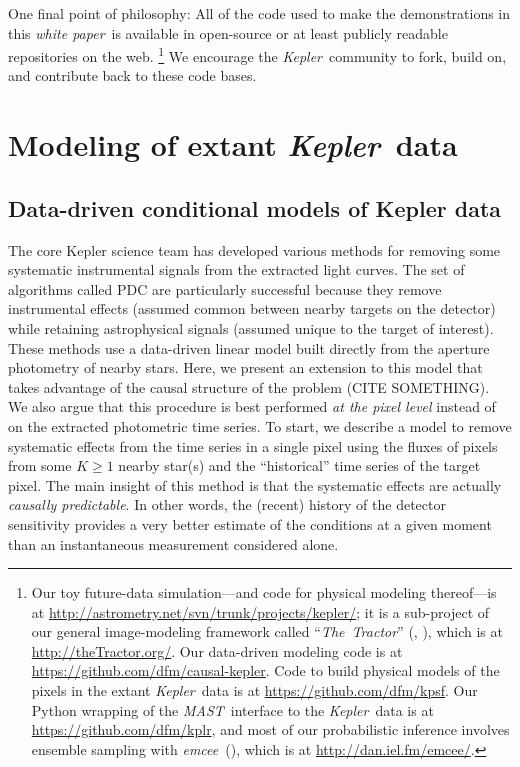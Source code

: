 \documentclass[letterpaper,12pt,preprint]{aastex}
\newcommand{\documentname}{\textsl{white paper}}
\newcommand{\observatory}[1]{\textsl{#1}}
\newcommand{\Kepler}{\observatory{Kepler}}
\newcommand{\project}[1]{\textsl{#1}}
\newcommand{\MAST}{\project{MAST}}
\newcommand{\TheTractor}{\project{The~Tractor}}
\newcommand{\emcee}{\project{emcee}}
\begin{document}
One final point of philosophy:
All of the code used to make the demonstrations in this \documentname\ is available
  in open-source or at least publicly readable repositories on the web.%
\footnote{Our toy future-data simulation---and code for physical modeling thereof---is at
  \url{http://astrometry.net/svn/trunk/projects/kepler/};
  it is a sub-project of our general image-modeling framework
  called ``\TheTractor'' (\citealt{hoggtractor}, \citealt{langtractor}), which is at
  \url{http://theTractor.org/}.
  Our data-driven modeling code is at
  \url{https://github.com/dfm/causal-kepler}.
  Code to build physical models of the pixels in the extant \Kepler\ data is at
  \url{https://github.com/dfm/kpsf}.
  Our Python wrapping of the \MAST\ interface to the \Kepler\ data is at
  \url{https://github.com/dfm/kplr},
  and most of our probabilistic inference involves ensemble sampling
  with \emcee\ (\citealt{emcee}), which is at
  \url{http://dan.iel.fm/emcee/}.}
We encourage the \Kepler\ community to fork, build on, and contribute back to these code bases.

\section{Modeling of extant \Kepler\ data}\label{sec:extant}

\subsection{Data-driven conditional models of Kepler data}

The core Kepler science team has developed various methods for removing some
systematic instrumental signals from the extracted light curves.
The set of algorithms called PDC \citep{map-pdc1,map-pdc2} are particularly
successful because they remove instrumental effects (assumed common between
nearby targets on the detector) while retaining astrophysical signals (assumed
unique to the target of interest).
These methods use a data-driven linear model built directly from the aperture
photometry of nearby stars.
Here, we present an extension to this model that takes advantage of the causal
structure of the problem (CITE SOMETHING).
We also argue that this procedure is best performed \emph{at the pixel level}
instead of on the extracted photometric time series.
To start, we describe a model to remove systematic effects from the time
series in a single pixel using the fluxes of pixels from some $K\ge1$ nearby
star(s) and the ``historical'' time series of the target pixel.
The main insight of this method is that the systematic effects are actually
\emph{causally predictable}.
In other words, the (recent) history of the detector sensitivity provides a
very better estimate of the conditions at a given moment than an
instantaneous measurement considered alone.
\end{document}

